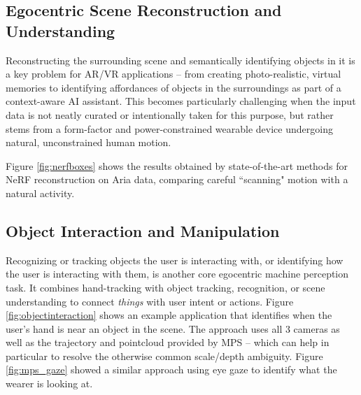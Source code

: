 \subsection{Egocentric Scene Reconstruction and Understanding}
Reconstructing the surrounding scene and semantically identifying objects in it is a key problem for AR/VR applications -- from creating photo-realistic, virtual memories to identifying affordances of objects in the surroundings as part of a context-aware AI assistant. This becomes particularly challenging when the input data is not neatly curated or intentionally taken for this purpose, but rather stems from a form-factor and power-constrained wearable device undergoing natural, unconstrained human motion. 

Figure \ref{fig:nerfboxes} shows the results obtained by state-of-the-art methods for NeRF reconstruction \cite{nerfstudio} on Aria data, comparing careful ``scanning" motion with a natural activity.
 


\subsection{Object Interaction and Manipulation}
Recognizing or tracking objects the user is interacting with, or identifying how the user is interacting with them, is another core egocentric machine perception task. It combines hand-tracking with object tracking, recognition, or scene understanding to connect \textit{things} with user intent or actions. 
Figure \ref{fig:objectinteraction} shows an example application that identifies when the user's hand is near an object in the scene. The approach uses all 3 cameras as well as the trajectory and pointcloud provided by MPS -- which can help in particular to resolve the otherwise common scale/depth ambiguity. Figure \ref{fig:mps_gaze} showed a similar approach using eye gaze to identify what the wearer is looking at. 


